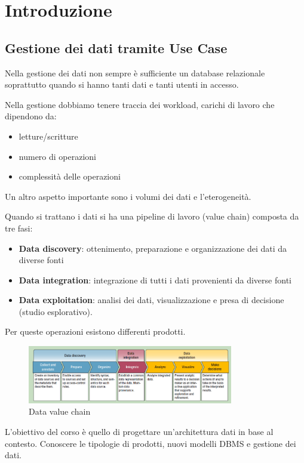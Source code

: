 \chapter{Introduzione}
\section{Gestione dei dati tramite Use Case}
Nella gestione dei dati non sempre è sufficiente un database relazionale soprattutto
quando si hanno tanti dati e tanti utenti in accesso.

Nella gestione dobbiamo tenere traccia dei workload, carichi di lavoro che dipendono da:
\begin{itemize}
    \item letture/scritture
    \item numero di operazioni
    \item complessità delle operazioni
\end{itemize}
Un altro aspetto importante sono i volumi dei dati e l'eterogeneità.

Quando si trattano i dati si ha una pipeline di lavoro (value chain) composta da
tre fasi:
\begin{itemize}
    \item \textbf{Data discovery}: ottenimento, preparazione e organizzazione
          dei dati da diverse fonti
    \item \textbf{Data integration}: integrazione di tutti i dati provenienti da
          diverse fonti
    \item \textbf{Data exploitation}: analisi dei dati, visualizzazione e presa
          di decisione (studio esplorativo).
\end{itemize}
Per queste operazioni esistono differenti prodotti.
\begin{figure}[ht]
    \centering
    \includegraphics[width=0.8\textwidth]{./img/data_chain.png}
    \caption{Data value chain}
    \label{fig:valChain}
\end{figure}

L'obiettivo del corso è quello di progettare un'architettura dati in base al
contesto. Conoscere le tipologie di prodotti, nuovi modelli DBMS e gestione dei
dati.

